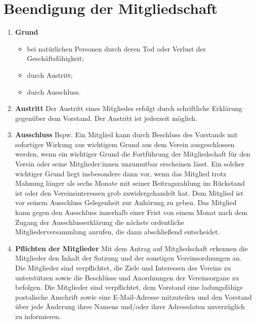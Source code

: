 \documentclass{scrartcl}
\begin{document}
    \section{Beendigung der Mitgliedschaft}
        \begin{enumerate}
            \item \textbf{Grund}
                \begin{itemize}
                    \item bei natürlichen Personen durch deren Tod oder Verlust der Geschäftsfähigkeit;
                    \item durch Austritt;
                    \item durch Ausschluss.
                \end{itemize}
            \item \textbf{Austritt} \newline
                Der Austritt eines Mitgliedes erfolgt durch schriftliche Erklärung gegenüber dem
                Vorstand. Der Austritt ist jederzeit möglich.
            \item \textbf{Ausschluss} \newline
                Bspw. Ein Mitglied kann durch Beschluss des Vorstands mit sofortiger Wirkung aus
                wichtigem Grund aus dem Verein ausgeschlossen werden, wenn ein wichtiger Grund die
                Fortführung der Mitgliedschaft für den Verein oder seine Mitglieder:innen unzumutbar
                erscheinen lässt.
                Ein solcher wichtiger Grund liegt insbesondere dann vor, wenn das Mitglied trotz Mahnung
                länger als sechs Monate mit seiner Beitragszahlung im Rückstand ist oder den
                Vereinsinteressen grob zuwidergehandelt hat.
                Dem Mitglied ist vor seinem Ausschluss Gelegenheit zur Anhörung zu geben.
                Das Mitglied kann gegen den Ausschluss innerhalb einer Frist von einem Monat nach dem
                Zugang der Ausschlusserklärung die nächste ordentliche Mitgliederversammlung anrufen,
                die dann abschließend entscheidet.
            \item \textbf{Pflichten der Mitglieder} \newline
                Mit dem Antrag auf Mitgliedschaft erkennen die Mitglieder den Inhalt der Satzung und der
                sonstigen Vereinsordnungen an. Die Mitglieder sind verpflichtet, die Ziele und Interessen des
                Vereins zu unterstützen sowie die Beschlüsse und Anordnungen der Vereinsorgane zu
                befolgen.
                Die Mitglieder sind verpflichtet, dem Vorstand eine ladungsfähige postalische Anschrift sowie
                eine E-Mail-Adresse mitzuteilen und den Vorstand über jede Änderung ihres Namens und/oder
                ihrer Adressdaten unverzüglich zu informieren.
        \end{enumerate}
\end{document}
